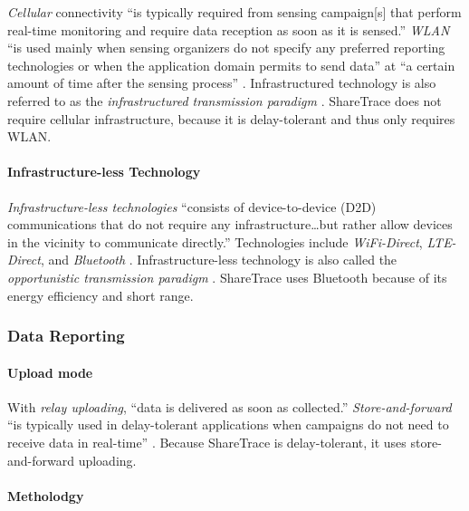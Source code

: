 \emph{Cellular} connectivity ``is typically required from sensing campaign[s] that perform real-time monitoring and require data reception as soon as it is sensed.'' \emph{WLAN} ``is used mainly when sensing organizers do not specify any preferred reporting technologies or when the application domain permits to send data'' at ``a certain amount of time after the sensing process'' \cite{Capponi2019}. Infrastructured technology is also referred to as the \emph{infrastructured transmission paradigm} \cite{Ma2014}. ShareTrace does not require cellular infrastructure, because it is delay-tolerant and thus only requires WLAN.

\paragraph{Infrastructure-less Technology}

\emph{Infrastructure-less technologies} ``consists of device-to-device (D2D) communications that do not require any infrastructure{\ldots}but rather allow devices in the vicinity to communicate directly.'' Technologies include \emph{WiFi-Direct}, \emph{LTE-Direct}, and \emph{Bluetooth} \citep{Capponi2019}. Infrastructure-less technology is also called the \emph{opportunistic transmission paradigm} \citep{Ma2014}. ShareTrace uses Bluetooth because of its energy efficiency and short range.

\subsubsection{Data Reporting}

\paragraph{Upload mode}

With \emph{relay uploading}, ``data is delivered as soon as collected.'' \emph{Store-and-forward} ``is typically used in delay-tolerant applications when campaigns do not need to receive data in real-time'' \citep{Capponi2019}. Because ShareTrace is delay-tolerant, it uses store-and-forward uploading.

\paragraph{Metholodgy}

